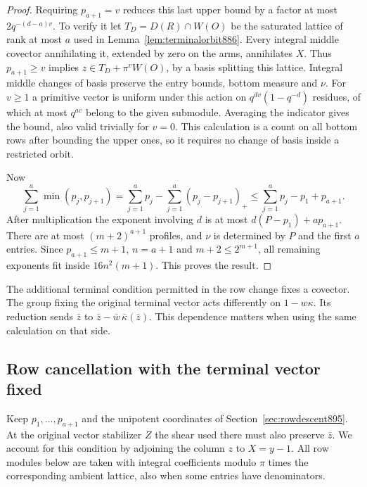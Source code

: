 \documentclass[a4paper,11pt]{article}
\theoremstyle{definition}
\theoremstyle{remark}
\numberwithin{equation}{section}
\begin{document}
\begin{proof}
Requiring \(p_{a+1}=v\) reduces this last upper bound by a factor
at most \(2q^{-(d-a)v}\). To verify it let \(T_D=D(R)\cap W(O)\)
be the saturated lattice of rank at most \(a\) used in
Lemma~\ref{lem:terminalorbit886}. Every integral middle covector
annihilating it, extended by zero on the arms, annihilates \(X\).
Thus \(p_{a+1}\ge v\) implies \(z\in T_D+\pi^v W(O)\), by a
basis splitting this lattice. Integral middle changes of basis
preserve the entry bounds, bottom measure and \(\nu\).
For \(v\ge1\) a primitive vector is uniform under this action
on \(q^{dv}(1-q^{-d})\) residues, of which at most \(q^{av}\)
belong to the given submodule. Averaging the indicator gives
the bound, also valid trivially for \(v=0\).
This calculation is a count on all bottom rows after bounding
the upper ones, so it requires no change of basis inside a
restricted orbit.

Now
\[
 \sum_{j=1}^a\min(p_j,p_{j+1})
     =\sum_{j=1}^a p_j-\sum_{j=1}^a(p_j-p_{j+1})_+
     \le \sum_{j=1}^a p_j-p_1+p_{a+1}.
\]
After multiplication the exponent involving \(d\) is at most
\(d(P-p_1)+a p_{a+1}\). There are at most \((m+2)^{a+1}\)
profiles, and \(\nu\) is determined by \(P\) and the first
\(a\) entries. Since \(p_{a+1}\le m+1\), \(n=a+1\) and
\(m+2\le2^{m+1}\), all remaining exponents fit inside
\(16n^2(m+1)\). This proves the result.
\end{proof}

The additional terminal condition permitted in the row change
fixes a covector. The group fixing the original terminal vector
acts differently on \(1-w\kappa\). Its reduction sends \(\bar z\)
to \(\bar z-\bar w\,\bar\kappa(\bar z)\). This dependence matters
when using the same calculation on that side.
\clearpage

\subsection{Row cancellation with the terminal vector fixed}
\label{sec:twodepth896}

Keep \(p_1,\ldots,p_{a+1}\) and the unipotent coordinates of
Section~\ref{sec:rowdescent895}. At the original vector stabilizer
\(Z\) the shear used there must also preserve \(\bar z\). We account
for this condition by adjoining the column \(z\) to \(X=y-1\).
All row modules below are taken with integral coefficients modulo
\(\pi\) times the corresponding ambient lattice, also when some
entries have denominators.
\end{document}
